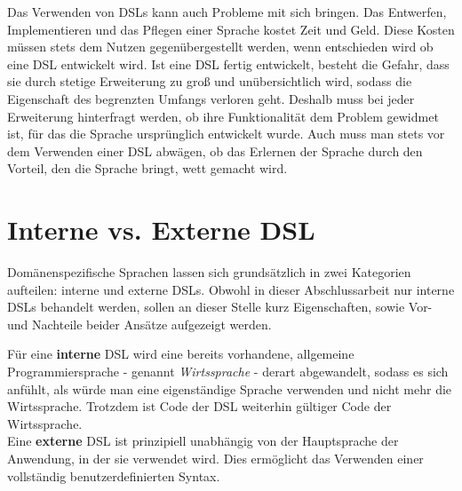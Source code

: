 Das Verwenden von DSLs kann auch Probleme mit sich bringen. Das Entwerfen, Implementieren und das Pflegen einer Sprache kostet Zeit und Geld. Diese Kosten müssen stets dem Nutzen gegenübergestellt werden, wenn entschieden wird ob eine DSL entwickelt wird. Ist eine DSL fertig entwickelt, besteht die Gefahr, dass sie durch stetige Erweiterung zu groß und unübersichtlich wird, sodass die Eigenschaft des begrenzten Umfangs verloren geht. Deshalb muss bei jeder Erweiterung hinterfragt werden, ob ihre Funktionalität dem Problem gewidmet ist, für das die Sprache ursprünglich entwickelt wurde. Auch muss man stets vor dem Verwenden einer DSL abwägen, ob das Erlernen der Sprache durch den Vorteil, den die Sprache bringt, wett gemacht wird\cite{www:fowlerWorkbench}.

\section{Interne vs. Externe DSL}\label{sct:intvsext}
Domänenspezifische Sprachen lassen sich grundsätzlich in zwei Kategorien aufteilen: interne und externe DSLs. Obwohl in dieser Abschlussarbeit nur interne DSLs behandelt werden, sollen an dieser Stelle kurz Eigenschaften, sowie Vor- und Nachteile beider Ansätze aufgezeigt werden.

Für eine \textbf{interne} DSL wird eine bereits vorhandene, allgemeine Programmiersprache - genannt \emph{Wirtssprache} - derart abgewandelt, sodass es sich anfühlt, als würde man eine eigenständige Sprache verwenden und nicht mehr die Wirtssprache. Trotzdem ist Code der DSL weiterhin gültiger Code der Wirtssprache.\\
Eine \textbf{externe} DSL ist prinzipiell unabhängig von der Hauptsprache der Anwendung, in der sie verwendet wird. Dies ermöglicht das Verwenden einer vollständig benutzerdefinierten Syntax.


